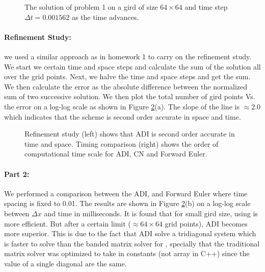 \begin{figure}[tbh]
  \caption{The solution of problem 1 on a gird of size $64\times 64$ and time step $\Delta t = 0.001562$ as the time advances. }
   \label{fig:sol}
\end{figure} 

\paragraph{Refinement Study:} we used a similar approach as in homework 1 to carry on the refinement study. We start we certain time and space steps and calculate the sum of the solution all over the grid points. Next, we halve the time and space steps and get the sum. We then calculate the error as the absolute difference between the normalized sum of two successive solution. We then plot the total number of gird points Vs. the error on a log-log scale as shown in Figure \ref{fig:ref}(a). The slope of the line is $\approx 2.0$ which indicates that the scheme is second order accurate in space and time. 
	
\begin{figure}[tbh]
 \centering  
  \caption{Refinement study (left) shows that ADI is second order accurate in time and space. Timing comparison (right) shows the order of computational time scale for ADI, CN and Forward Euler.}
   \label{fig:ref}
\end{figure} 

\paragraph{Part 2:}
We performed a comparison between the ADI, \protect{\cn} and Forward Euler where time spacing is fixed to 0.01. The results are shown in Figure \ref{fig:ref}(b) on a log-log scale between $\Delta x$ and time in milliseconds. It is found that for small gird size, using \protect{\cn} is more efficient. But after a certain limit ($\approx 64 \times 64$ grid points), ADI becomes more superior. This is due to the fact that ADI solve a tridiagonal system which is faster to solve than the banded matrix solver for \protect{\cn}, specially that the traditional matrix solver was optimized to take in constants (not array in C++) since the value of a single diagonal are the same. 


